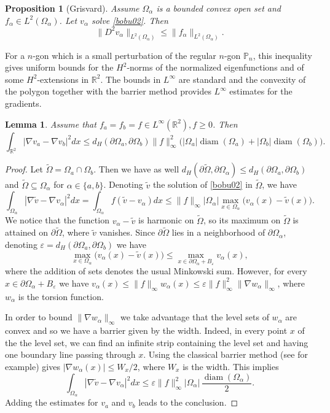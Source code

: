 \documentclass[JEP,XML,SOM,Unicode,ThmDefs,NoFloatCountersInSection,published]{cedram}
\theoremstyle{plain}
\newtheorem{lemma}[thm]{Lemma}
\newtheorem{propo}[thm]{Proposition}
\theoremstyle{definition}
\newcommand{\diam}{\operatorname{diam}}
\def\R{\mathbb{R}}
\newcommand{\vps}{\varepsilon}
\newcommand{\Om}{\Omega}
\newcommand{\sq}{\subseteq}
\begin{document}
\begin{propo}[Grisvard]
Assume $\Om_\alpha$ is a bounded convex open set and $f_\alpha \in L^2(\Om_\alpha)$.
Let $v_\alpha$ solve \eqref{bobu02}. Then
\[
\|D^2 v_\alpha\|_{L^2(\Om_\alpha)} \le \|f_\alpha\|_{L^2(\Om_\alpha)}.
\]
\end{propo}
For a $n$-gon which is a small perturbation of the regular $n$-gon $\mathbb P_n$, this inequality gives uniform bounds for the $H^2$-norms of the normalized eigenfunctions and of some $H^2$\nobreakdash-extensions in $\R^2$. The bounds in $L^\infty$ are standard and the convexity of the polygon together with the barrier method provides $L^\infty$ estimates for the gradients.

\begin{lemma}\label{bb05}
Assume that $f_a=f_b= f \in L^\infty (\R^2), f \ge 0$. Then
\begin{equation}\label{bb05.1}
\int_{\R^2} |\nabla v_{a}-\nabla v_b |^2 dx\le d_H(\partial \Om_{a}, \partial \Om_{b}) \|f\|_\infty^2 \Big (|\Om_a|\diam (\Om_a) +|\Om_b|\diam (\Om_b)\Big).
\end{equation}
\end{lemma}
\begin{proof}
Let $\tilde \Om =\Om_a \cap \Om_b$. Then we have as well $d_H(\partial \tilde \Om, \partial \Om_\alpha) \le d_H(\partial \Om_{a}, \partial \Om_{b}) $ and $\tilde \Om \sq \Om_\alpha$ for $\alpha\in \{a,b\}$. Denoting $\tilde v$ the solution of \eqref{bobu02} in $\tilde \Om$, we have
\[
\int_{\Om_\alpha} |\nabla \tilde v -\nabla v_\alpha |^2 dx= \int_{\Om_\alpha} f(\tilde v-v_\alpha) dx\le\|f\|_\infty |\Om_\alpha| \max_{x \in\Om_\alpha} \big (v_\alpha(x)-\tilde v (x)\big).
\]
We notice that the function $v_\alpha -\tilde v$ is harmonic on $\tilde \Om$, so its maximum on $\tilde \Om$ is attained on $\partial \tilde \Om$, where $\tilde v$ vanishes. Since $\partial \tilde \Om$ lies in a neighborhood of $\partial \Om_\alpha$, denoting $\vps = d_H(\partial \Om_{a}, \partial \Om_{b})$ we have
\[
\max_{x \in\Om_\alpha } \big (v_\alpha(x)-\tilde v (x) \big) \le \max_{x \in \partial \Om_\alpha + B_\vps}v_\alpha(x),
\]
where the addition of sets denotes the usual Minkowski sum.
However, for every $x \in \partial \Om_\alpha + B_\vps$ we have $v_\alpha(x)\le \|f\|_\infty w_\alpha(x)\le \vps \|f\|_\infty^2 \|\nabla w_\alpha \|_\infty$, where $w_\alpha$ is the torsion function.

In order to bound $\|\nabla w_\alpha \|_\infty$ we take advantage that the level sets of $w_\alpha$ are convex and so we have a barrier given by the width. Indeed, in every point $x$ of the the level set, we can find an infinite strip containing the level set and having one boundary line passing through $x$. Using the classical barrier method (see \cite{Tr72} for example) gives $ |\nabla w_{\alpha}(x)| \le W_x/2$, where $W_x$ is the width. This implies
\[
\int_{\Om_\alpha} |\nabla \tilde v-\nabla v_\alpha |^2 dx \le \vps \|f\|_\infty^2 |\Om_\alpha| \,\frac{\diam (\Om_\alpha)}{ 2}.
\]
Adding the estimates for $v_a$ and $v_b$ leads to the conclusion.
\end{proof}
\end{document}
